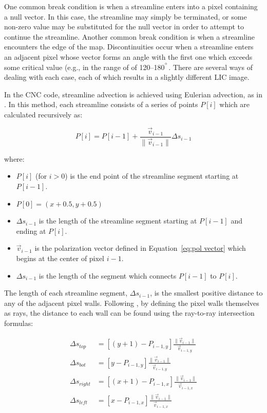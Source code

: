 One common break condition is when a streamline enters into a pixel containing a null vector. In this case, the streamline may simply be terminated, or some non-zero value may be substituted for the null vector in order to attempt to continue the streamline. Another common break condition is when a streamline encounters the edge of the map. Discontinuities occur when a streamline enters an adjacent pixel whose vector forms an angle with the first one which exceeds some critical value (e.g., in the range of of 120--180$^{\degree}$. There are several ways of dealing with each case, each of which results in a slightly different LIC image.

In the CNC code, streamline advection is achieved using Eulerian advection, as in \citet{cabral1993imaging}. In this method, each streamline consists of a series of points $P[i]$ which are calculated recursively as:

\begin{equation}
  P[i] = P[i - 1] + \frac{\vec{v}_{i - 1}}{\lVert \vec{v}_{i - 1} \rVert} \Delta s_{i - 1}
\end{equation}

where:
\begin{itemize}[label={},nosep]
  \item $P[i]$ (for $i > 0$) is the end point of the streamline segment starting at $P[i - 1]$.
  \item $P[0] = (x + 0.5, y + 0.5)$
  \item $\Delta s_{i - 1}$ is the length of the streamline segment starting at $P[i - 1]$ and ending at $P[i]$.
  \item $\vec{v}_{i - 1}$ is the polarization vector defined in Equation~\ref{eq:pol vector} which begins at the center of pixel $i - 1$.
  \item $\Delta s_{i - 1}$ is the length of the segment which connects $P[i - 1]$ to $P[i]$.
\end{itemize}

The length of each streamline segment, $\Delta s_{i - 1}$, is the smallest positive distance to any of the adjacent pixel walls. Following \citet{ma1996texture}, by defining the pixel walls themselves as rays, the distance to each wall can be found using the ray-to-ray intersection formulas:

\begin{align*}
  \Delta s_{top} &= \left[ (y + 1) - P_{i - 1,y} \right] \frac{ \lVert \vec{v}_{i - 1} \rVert }{ \vec{v}_{i - 1,y} } \\
  \Delta s_{bot} &= \left[ y - P_{i - 1,y} \right] \frac{ \lVert \vec{v}_{i - 1} \rVert }{\vec{v}_{i - 1,y} } \\
  \Delta s_{right} &= \left[ (x + 1) - P_{i - 1,x} \right] \frac{ \lVert \vec{v}_{i - 1} \rVert }{ \vec{v}_{i - 1,x} } \\
  \Delta s_{left} &= \left[ x - P_{i - 1,x} \right] \frac{ \lVert \vec{v}_{i - 1} \rVert }{\vec{v}_{i - 1,x}} \\
\end{align*}

